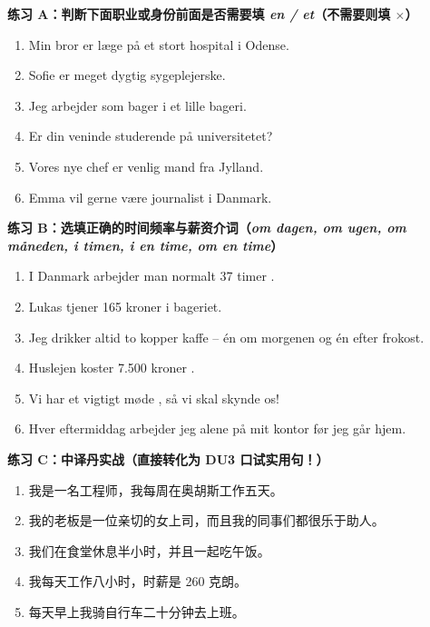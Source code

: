 \textbf{练习 A：判断下面职业或身份前面是否需要填 \textit{en / et}（不需要则填 $\times$）}
\begin{enumerate}
  \item Min bror er \underline{\hspace{1.4cm}} læge på et stort hospital i Odense.
  \item Sofie er \underline{\hspace{1.4cm}} meget dygtig sygeplejerske.
  \item Jeg arbejder som \underline{\hspace{1.4cm}} bager i et lille bageri.
  \item Er din veninde \underline{\hspace{1.4cm}} studerende på universitetet?
  \item Vores nye chef er \underline{\hspace{1.4cm}} venlig mand fra Jylland.
  \item Emma vil gerne være \underline{\hspace{1.4cm}} journalist i Danmark.
\end{enumerate}

\textbf{练习 B：选填正确的时间频率与薪资介词（\textit{om dagen, om ugen, om måneden, i timen, i en time, om en time}）}
\begin{enumerate}
  \item I Danmark arbejder man normalt 37 timer \underline{\hspace{2.6cm}}.
  \item Lukas tjener 165 kroner \underline{\hspace{2.6cm}} i bageriet.
  \item Jeg drikker altid to kopper kaffe \underline{\hspace{2.6cm}} – én om morgenen og én efter frokost.
  \item Huslejen koster 7.500 kroner \underline{\hspace{2.6cm}}.
  \item Vi har et vigtigt møde \underline{\hspace{2.6cm}}, så vi skal skynde os!
  \item Hver eftermiddag arbejder jeg alene \underline{\hspace{2.6cm}} på mit kontor før jeg går hjem.
\end{enumerate}

\textbf{练习 C：中译丹实战（直接转化为 DU3 口试实用句！）}
\begin{enumerate}
  \item 我是一名工程师，我每周在奥胡斯工作五天。
  \item 我的老板是一位亲切的女上司，而且我的同事们都很乐于助人。
  \item 我们在食堂休息半小时，并且一起吃午饭。
  \item 我每天工作八小时，时薪是 260 克朗。
  \item 每天早上我骑自行车二十分钟去上班。
\end{enumerate}

